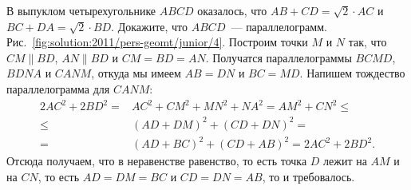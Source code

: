 \problem
В выпуклом четырехугольнике $ABCD$ оказалось, что
$AB + CD = \sqrt{2} \cdot AC$
и
$BC + DA = \sqrt{2} \cdot BD$.
Докажите, что $ABCD$~--- параллелограмм.
%
\label{solution:2011/pers-geomt/junior/4}%
Рис.~\ref{fig:solution:2011/pers-geomt/junior/4}.
Построим точки $M$ и $N$ так, что
$CM \parallel BD$, $AN \parallel BD$ и $CM = BD = AN$.
Получатся параллелограммы $BCMD$, $BDNA$ и $CANM$, откуда мы
имеем $AB = DN$ и $BC = MD$.
Напишем тождество параллелограмма для $CANM$:
\begin{align*}
    2 AC^2 + 2 BD^2
={}&
    AC^2 + CM^2 + MN^2 + NA^2
=
    AM^2 + CN^2
\leq\\\leq{}&
    (AD + DM)^2 + (CD + DN)^2
=\\={}&
    (AD + BC)^2 + (CD + AB)^2
=
    2 AC^2 + 2 BD^2
.\end{align*}
Отсюда получаем, что в неравенстве равенство, то есть точка $D$ лежит на
$AM$ и на $CN$, то есть $AD = DM = BC$ и $CD = DN = AB$, то и требовалось.
\endproblem
